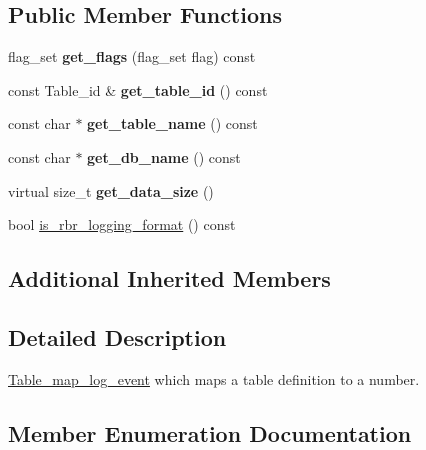 \subsection*{Public Member Functions}
\begin{DoxyCompactItemize}
\item 
\mbox{\label{classTable__map__log__event_a6021476721de4ce3e38f5008c70450c5}} 
flag\+\_\+set {\bfseries get\+\_\+flags} (flag\+\_\+set flag) const
\item 
\mbox{\label{classTable__map__log__event_a14bc5ba2018859a2cbaa956459c82e5e}} 
const Table\+\_\+id \& {\bfseries get\+\_\+table\+\_\+id} () const
\item 
\mbox{\label{classTable__map__log__event_ab1ba102e538449737a69ab3aa3258efc}} 
const char $\ast$ {\bfseries get\+\_\+table\+\_\+name} () const
\item 
\mbox{\label{classTable__map__log__event_a7ca380c7c12c97c6b1ef754f214c0de7}} 
const char $\ast$ {\bfseries get\+\_\+db\+\_\+name} () const
\item 
\mbox{\label{classTable__map__log__event_a132bc41c50aad2d5eea088adb3a2701a}} 
virtual size\+\_\+t {\bfseries get\+\_\+data\+\_\+size} ()
\item 
bool \mbox{\hyperlink{classTable__map__log__event_ab810d5c553584af2edf7fcaa3308fc77}{is\+\_\+rbr\+\_\+logging\+\_\+format}} () const
\end{DoxyCompactItemize}
\subsection*{Additional Inherited Members}


\subsection{Detailed Description}
\mbox{\hyperlink{classTable__map__log__event}{Table\+\_\+map\+\_\+log\+\_\+event}} which maps a table definition to a number. 

\subsection{Member Enumeration Documentation}
\mbox{\label{classTable__map__log__event_a6e8d763976b2e68e9cfa14575de56ea3}} 
